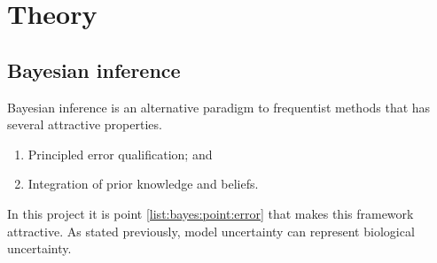 \documentclass[12pt]{article} %
\begin{document}
	
%	

	\section{Theory}	
	\subsection{Bayesian inference}	
	Bayesian inference is an alternative paradigm to frequentist methods that has several attractive properties.
	
	\begin{enumerate} \label{list:bayes}
		\item \label{list:bayes:point:error} Principled error qualification; and 
		\item Integration of prior knowledge and beliefs. %
	\end{enumerate}
	In this project it is point \ref{list:bayes:point:error} that makes this framework attractive. As stated previously, model uncertainty can represent biological uncertainty.
	
\end{document}
